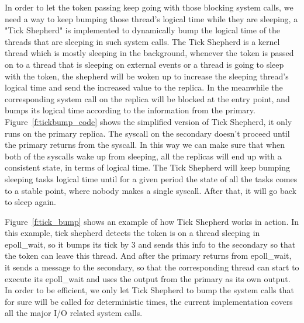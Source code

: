 In order to let the token passing keep going with those blocking system calls, we need a way to keep bumping those thread's logical time while they are sleeping, a "Tick Shepherd" is implemented to dynamically bump the logical time of the threads that are sleeping in such system calls. The Tick Shepherd is a kernel thread which is mostly sleeping in the background, whenever the token is passed on to a thread that is sleeping on external events or a thread is going to sleep with the token, the shepherd will be woken up to increase the sleeping thread's logical time and send the increased value to the replica. In the meanwhile the corresponding system call on the replica will be blocked at the entry point, and bumps its logical time according to the information from the primary. Figure~\ref{f:tickbump_code} shows the simplified version of Tick Shepherd, it only runs on the primary replica. The syscall on the secondary doesn't proceed until the primary returns from the syscall. In this way we can make sure that when both of the syscalls wake up from sleeping, all the replicas will end up with a consistent state, in terms of logical time. The Tick Shepherd will keep bumping sleeping tasks logical time until for a given period the state of all the tasks comes to a stable point, where nobody makes a single syscall. After that, it will go back to sleep again.

Figure~\ref{f:tick_bump} shows an example of how Tick Shepherd works in action. In this example, tick shepherd detects the token is on a thread sleeping in epoll\_wait, so it bumps its tick by 3 and sends this info to the secondary so that the token can leave this thread. And after the primary returns from epoll\_wait, it sends a message to the secondary, so that the corresponding thread can start to execute its epoll\_wait and uses the output from the primary as its own output. In order to be efficient, we only let Tick Shepherd to bump the system calls that for sure will be called for deterministic times, the current implementation covers all the major I/O related system calls.

